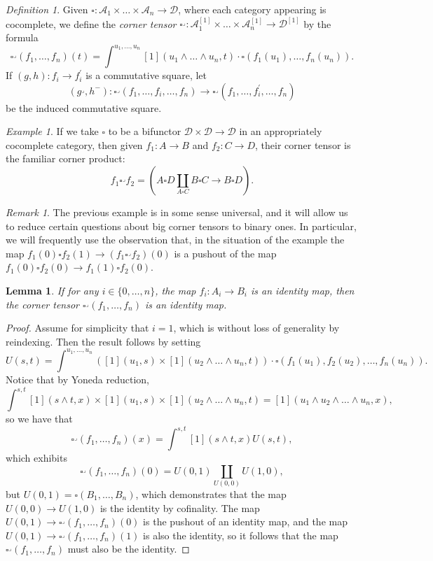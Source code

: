 \documentclass[leqno]{article}
\numberwithin{equation}{subsection}
\theoremstyle{plain}   %
\newtheorem{lemma}[equation]{Lemma}
\theoremstyle{remark}
\newtheorem{rem}[equation]{Remark}
\newtheorem{example}[equation]{Example}
\newtheorem{defn}[equation]{Definition}
\theoremstyle{plain}
\begin{document}
\begin{defn}
	Given \(\square:\mathcal{A}_1\times \dots \times \mathcal{A}_n \to \mathcal{D}\), where each category appearing is cocomplete, we define the \emph{corner tensor} \(\square^\lrcorner:\mathcal{A}_1^{[1]}\times \dots \times \mathcal{A}_n^{[1]} \to \mathcal{D}^{[1]}\) by the formula
	\[\square^\lrcorner(f_1,\dots,f_n)(t)=\int^{u_1,\dots,u_n} [1](u_1\wedge\dots\wedge u_n, t) \cdot \square(f_1(u_1),\dots,f_n(u_n)).\]
	If \((g,h): f_i\to f^\prime_i\) is a commutative square, let 
	\[
		(g^\lrcorner,h^{-}):\square^\lrcorner(f_1,\dots,f_i,\dots,f_n) \to \square^\lrcorner(f_1,\dots,f^\prime_i,\dots,f_n)
	\]
	be the induced commutative square.  
\end{defn}
\begin{example}
	If we take \(\square\) to be a bifunctor \(\mathcal{D}\times \mathcal{D} \to \mathcal{D}\) in an appropriately cocomplete category, then given \(f_1:A\to B\) and \(f_2:C\to D\), their corner tensor is the familiar corner product: 
	\[
		f_1 \square^\lrcorner f_2 = \left(A\square D \coprod_{A\square C} B\square C \to  B\square D\right).
	\]
\end{example}
\begin{rem}
	The previous example is in some sense universal, and it will allow us to reduce certain questions about big corner tensors to binary ones. In particular, we will frequently use the observation that, in the situation of the example the map \(f_1(0) \square f_2(1) \to (f_1 \square^\lrcorner f_2)(0)\) is a pushout of the map \(f_1(0) \square f_2(0) \to f_1(1) \square f_2(0)\).
\end{rem}
\begin{lemma}\label{corneridentities}
	If for any \(i\in \{0,\dots,n\}\), the map \(f_i:A_i\to B_i\) is an identity map, then the corner tensor \(\square^\lrcorner(f_1,\dots,f_n)\) is an identity map.
\end{lemma}
\begin{proof}
	Assume for simplicity that \(i=1\), which is without loss of generality by reindexing.  Then the result follows by setting 
	\[
		U(s,t)=\int^{u_1,\dots,u_n} \left([1](u_1,s) \times [1](u_2\wedge\dots\wedge u_n,t)\right)\cdot \square(f_1(u_1),f_2(u_2),\dots, f_n(u_n)).
	\]
	Notice that by Yoneda reduction,
	\[
		\int^{s,t} [1](s\wedge t,x) \times [1](u_1,s) \times [1](u_2\wedge\dots\wedge u_n,t) = [1](u_1 \wedge u_2 \wedge \dots\wedge u_n,x),
	\]
	so we have that 
	\[
		\square^\lrcorner(f_1,\dots,f_n)(x)=\int^{s,t} [1](s\wedge t,x) U(s,t),
	\]
	which exhibits 
	\[
		\square^\lrcorner(f_1,\dots,f_n)(0)=U(0,1)\coprod_{U(0,0)} U(1,0),
	\]
	but \(U(0,1)=\square(B_1,\dots,B_n)\), which demonstrates that the map \(U(0,0) \to U(1,0)\) is the identity by cofinality. The map \(U(0,1) \to \square^\lrcorner(f_1,\dots,f_n)(0)\) is the pushout of an identity map, and the map \(U(0,1)\to \square^\lrcorner(f_1,\dots,f_n)(1)\) is also the identity, so it follows that the map \(\square^\lrcorner(f_1,\dots,f_n)\) must also be the identity.
\end{proof}
\end{document}

